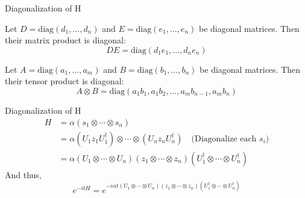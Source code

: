 \documentclass[aspectratio=169,xcolor=dvipsnames]{beamer}
\begin{document}
\begin{frame}{Diagonalization of H}
\begin{lemma}
Let $D = \mathrm{diag}(d_1,\ldots,d_n)$ and $E = \mathrm{diag}(e_1,\ldots,e_n)$ be diagonal matrices. Then their matrix product is diagonal:
\[
DE = \mathrm{diag}(d_1e_1, \ldots, d_ne_n)
\]
\end{lemma}
\begin{lemma}
Let $A = \mathrm{diag}(a_1,\ldots,a_m)$ and $B = \mathrm{diag}(b_1,\ldots,b_n)$ be diagonal matrices. Then their tensor product is diagonal:
\[
A \otimes B = \mathrm{diag}(a_1b_1, a_1b_2, \ldots, a_mb_{n-1}, a_mb_n)
\]
\end{lemma}

\end{frame}

\begin{frame}{Diagonalization of H}
  \begin{align*}
    H &= \alpha (s_1 \otimes \cdots \otimes s_n) \\
      &= \alpha (U_1 z_1 U_1^\dagger) \otimes \cdots \otimes (U_n z_n U_n^\dagger) \quad \text{(Diagonalize each $s_i$)} \\
      &= \alpha (U_1 \otimes \cdots \otimes U_n)(z_1 \otimes \cdots \otimes z_n)(U_1^\dagger \otimes \cdots \otimes U_n^\dagger)
  \end{align*}
  And thus, 
  \begin{equation*}
    e^{-i t H} = e^{-i \alpha t (U_1 \otimes \cdots \otimes U_n)(z_1 \otimes \cdots \otimes z_n)(U_1^\dagger \otimes \cdots \otimes U_n^\dagger)}
  \end{equation*}

\end{frame}
\end{document}
